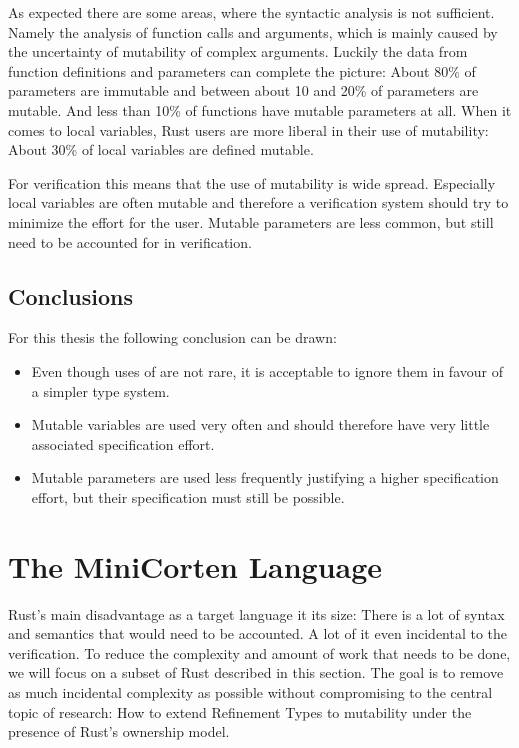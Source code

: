 \documentclass[twoside, english, final]{sdqthesis}
\theoremstyle{definition}
\begin{document}
As expected there are some areas, where the syntactic analysis is not sufficient. Namely the analysis of function calls and arguments, which is mainly caused by the uncertainty of mutability of complex arguments.
Luckily the data from function definitions and parameters can complete the picture: About 80\% of parameters are immutable and between about 10 and 20\% of parameters are mutable. And less than 10\% of functions have mutable parameters at all.
When it comes to local variables, Rust users are more liberal in their use of mutability:
About 30\% of local variables are defined mutable.

For verification this means that the use of mutability is wide spread. Especially local variables are often mutable and therefore a verification system should try to minimize the effort for the user. Mutable parameters are less common, but still need to be accounted for in verification.

\section{Conclusions}

For this thesis the following conclusion can be drawn:

\begin{itemize}
  \item Even though uses of  are not rare, it is acceptable to ignore them in favour of a simpler type system.
  \item Mutable variables are used very often and should therefore have very little associated specification effort.
  \item Mutable parameters are used less frequently justifying a higher specification effort, but their specification must still be possible.
\end{itemize}

\chapter{The MiniCorten Language} \label{ch:language} 

Rust's main disadvantage as a target language it its size: There is a lot of syntax and semantics that would need to be accounted. A lot of it even incidental to the verification. 
To reduce the complexity and amount of work that needs to be done, we will focus on a subset of Rust described in this section.
The goal is to remove as much incidental complexity as possible without compromising to the central topic of research: How to extend Refinement Types to mutability under the presence of Rust's ownership model. 
\end{document}
